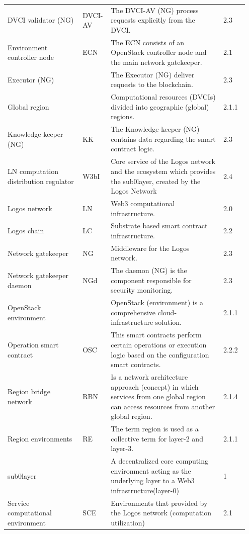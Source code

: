 \documentclass[]{article}
\begin{document}
\begin{longtable}{p{0.3\linewidth} p{0.1\linewidth} p{0.45\linewidth} p{0.1\linewidth}}
DVCI validator (NG) & DVCI-AV & The DVCI-AV (NG) process requests explicitly from the DVCI. & 2.3 \\ %
Environment controller node & ECN & The ECN consists of an OpenStack controller node and the main network gatekeeper. & 2.1 \\ %
Executor (NG) & & The Executor (NG) deliver requests to the blockchain. & 2.3 \\ %
Global region & & Computational resources (DVCIs) divided into geographic (global) regions. & 2.1.1 \\ %
Knowledge keeper (NG) & KK & The Knowledge keeper (NG) contains data regarding the smart contract logic. & 2.3 \\ %
LN computation distribution regulator & W3bI & Core service of the Logos network and the ecosystem which provides the sub0layer, created by the Logos Network & 2.4 \\ %
Logos network & LN & Web3 computational infrastructure. & 2.0 \\ %
Logos chain & LC & Substrate based smart contract infrastructure. & 2.2 \\ %
Network gatekeeper & NG & Middleware for the Logos network. & 2.3 \\ %
Network gatekeeper daemon & NGd & The daemon (NG) is the component responsible for security monitoring. & 2.3 \\ %
OpenStack environment & & OpenStack (environment) is a comprehensive cloud-infrastructure solution. & 2.1.1 \\ %
Operation smart contract & OSC & This smart contracts perform certain operations or execution logic based on the configuration smart contracts. & 2.2.2 \\ %
Region bridge network & RBN & Is a network architecture approach (concept) in which services from one global region can access resources from another global region. & 2.1.4 \\ %
Region environments & RE & The term region is used as a collective term for layer-2 and layer-3. & 2.1.1 \\ %
sub0layer & & A decentralized core computing environment acting as the underlying layer to a Web3 infrastructure(layer-0) & 1 \\ %
Service computational environment & SCE & Environments that provided by the Logos network (computation utilization)  & 2.1 \\ %

\end{longtable}
\end{document}

